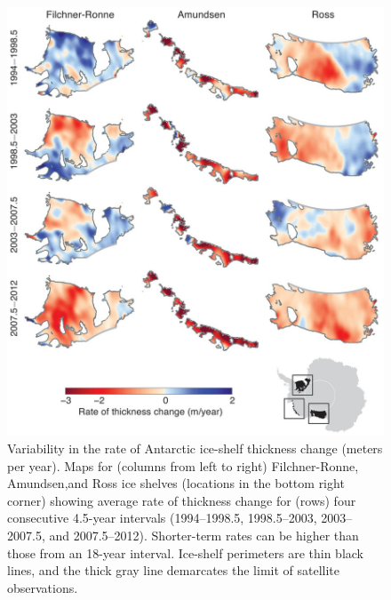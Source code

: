 \begin{figure}[!h]
  \centering
  \vspace{1.2cm}
  \includegraphics[width=.95\textwidth]{img/Fig2_pannels_review_final.jpg}
  \vspace{.8cm}
  \caption[Variability in the rate of ice-shelf thickness change]{
  Variability in the rate of Antarctic ice-shelf thickness change
  (meters per year). Maps for (columns from left to right) Filchner-Ronne,
  Amundsen,and Ross ice shelves (locations in the bottom right corner) showing
  average rate of thickness change for (rows) four consecutive 4.5-year
  intervals (1994--1998.5, 1998.5--2003, 2003--2007.5, and 2007.5--2012).
  Shorter-term rates can be higher than those from an 18-year interval.
  Ice-shelf perimeters are thin black lines, and the thick gray line demarcates
  the limit of satellite observations.}
  \label{fig:ice-shelf-var}
\end{figure}
\clearpage


